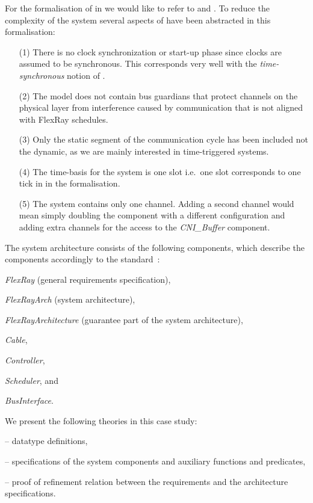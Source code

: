 For the formalisation of \fr in \Focus we would like to refer to  \cite{efts_book} and \cite{spichkova}. 
To reduce the complexity of the system several aspects of \fr have been abstracted in this formalisation:
%
\begin{itemize}
\item[(1)] There is no clock synchronization or start-up phase since clocks are assumed to be synchronous. 
This corresponds very well with the \emph{time-synchronous} notion of \Focus.
%
\item[(2)] The model does not contain bus guardians that protect channels on the physical layer from interference caused by communication that is not aligned with FlexRay schedules.
%
\item[(3)] Only the static segment of the communication cycle has been included not the dynamic, 
as we are mainly interested in time-triggered systems.
%
\item[(4)] The time-basis for the system is one slot i.e.\ one slot \fr corresponds to one tick in in the formalisation.
%
\item[(5)] The system contains only one \fr channel. Adding a second channel 
would mean simply doubling the \fr component with a different configuration 
and adding extra channels for the access to the \emph{CNI\_Buffer} component.
\end{itemize}
% 
The system architecture consists of the following components, 
which describe the \fr components accordingly to the \fr standard~\cite{FlexRayProt}: 
%
\begin{itemize*}
	\item \emph{FlexRay} (general requirements specification), 
	\item \emph{FlexRayArch} (system architecture),   
	\item \emph{FlexRayArchitecture} 
(guarantee part of the system architecture), 
  \item \emph{Cable}, 
  \item \emph{Controller}, 
  \item \emph{Scheduler}, and 
  \item \emph{BusInterface}. 
  \end{itemize*}
We present the following \isah theories in this case study:
%
\begin{itemize*}
  \item {} -- datatype definitions, 
	\item {} --  specifications of the system components and auxiliary functions and predicates, 
	\item {} --   proof of refinement relation between the requirements and the architecture specifications.
\end{itemize*}
